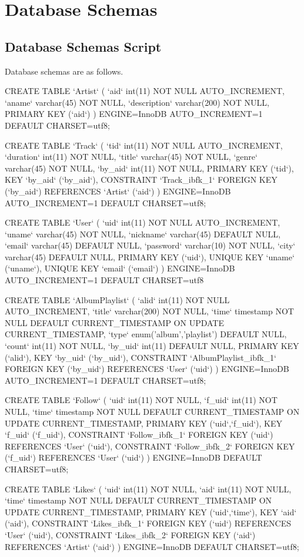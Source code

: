 \documentclass[letter, 12pt]{report}
\begin{document}
	\section{Database Schemas}
	\subsection{Database Schemas Script}
	Database schemas are as follows.
	\begin{spverbatim}
	CREATE TABLE `Artist` (
	`aid` int(11) NOT NULL AUTO_INCREMENT,
	`aname` varchar(45) NOT NULL,
	`description` varchar(200) NOT NULL,
	PRIMARY KEY (`aid`)
	) ENGINE=InnoDB AUTO_INCREMENT=1 DEFAULT CHARSET=utf8;
	
	CREATE TABLE `Track` (
	`tid` int(11) NOT NULL AUTO_INCREMENT,
	`duration` int(11) NOT NULL,
	`title` varchar(45) NOT NULL,
	`genre` varchar(45) NOT NULL,
	`by_aid` int(11) NOT NULL,
	PRIMARY KEY (`tid`),
	KEY `by_aid` (`by_aid`),
	CONSTRAINT `Track_ibfk_1` FOREIGN KEY (`by_aid`) REFERENCES `Artist` (`aid`)
	) ENGINE=InnoDB AUTO_INCREMENT=1 DEFAULT CHARSET=utf8;
	
	CREATE TABLE `User` (
	`uid` int(11) NOT NULL AUTO_INCREMENT,
	`uname` varchar(45) NOT NULL,
	`nickname` varchar(45) DEFAULT NULL,
	`email` varchar(45) DEFAULT NULL,
	`password` varchar(10) NOT NULL,
	`city` varchar(45) DEFAULT NULL,
	PRIMARY KEY (`uid`),
	UNIQUE KEY `uname` (`uname`),
	UNIQUE KEY `email` (`email`)
	) ENGINE=InnoDB AUTO_INCREMENT=1 DEFAULT CHARSET=utf8
	
	CREATE TABLE `AlbumPlaylist` (
	`alid` int(11) NOT NULL AUTO_INCREMENT,
	`title` varchar(200) NOT NULL,
	`time` timestamp NOT NULL DEFAULT CURRENT_TIMESTAMP ON UPDATE CURRENT_TIMESTAMP,
	`type` enum('album','playlist') DEFAULT NULL,
	`count` int(11) NOT NULL,
	`by_uid` int(11) DEFAULT NULL,
	PRIMARY KEY (`alid`),
	KEY `by_uid` (`by_uid`),
	CONSTRAINT `AlbumPlaylist_ibfk_1` FOREIGN KEY (`by_uid`) REFERENCES `User` (`uid`)
	) ENGINE=InnoDB AUTO_INCREMENT=1 DEFAULT CHARSET=utf8;
	
	CREATE TABLE `Follow` (
	`uid` int(11) NOT NULL,
	`f_uid` int(11) NOT NULL,
	`time` timestamp NOT NULL DEFAULT CURRENT_TIMESTAMP ON UPDATE CURRENT_TIMESTAMP,
	PRIMARY KEY (`uid`,`f_uid`),
	KEY `f_uid` (`f_uid`),
	CONSTRAINT `Follow_ibfk_1` FOREIGN KEY (`uid`) REFERENCES `User` (`uid`),
	CONSTRAINT `Follow_ibfk_2` FOREIGN KEY (`f_uid`) REFERENCES `User` (`uid`)
	) ENGINE=InnoDB DEFAULT CHARSET=utf8;
	
	CREATE TABLE `Likes` (
	`uid` int(11) NOT NULL,
	`aid` int(11) NOT NULL,
	`time` timestamp NOT NULL DEFAULT CURRENT_TIMESTAMP ON UPDATE CURRENT_TIMESTAMP,
	PRIMARY KEY (`uid`,`time`),
	KEY `aid` (`aid`),
	CONSTRAINT `Likes_ibfk_1` FOREIGN KEY (`uid`) REFERENCES `User` (`uid`),
	CONSTRAINT `Likes_ibfk_2` FOREIGN KEY (`aid`) REFERENCES `Artist` (`aid`)
	) ENGINE=InnoDB DEFAULT CHARSET=utf8;
	

\end{spverbatim}
\end{document}
